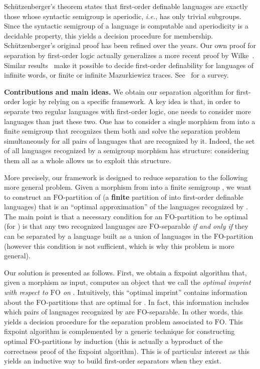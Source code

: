 \documentclass{CSML}
\newcommand{\fo}{\ensuremath{\text{FO}}\xspace}
\theoremstyle{plain}
\begin{document}
Schützenberger's theorem states that first-order definable languages
are exactly those whose syntactic semigroup is aperiodic, \emph{i.e.},
has only trivial subgroups. Since the syntactic semigroup of a
language is computable and aperiodicity is a decidable property, this
yields a decision procedure for membership. Schützenberger's original
proof has been refined over the years. Our own proof for separation by
first-order logic actually generalizes a more recent proof by
Wilke~\cite{wfo}. Similar results~\cite{tfo,pfo} make it possible to decide
first-order definability for languages of infinite words, or finite or
infinite Mazurkiewicz
traces. See~\cite{Diekert&Gastin:First-order-definable-languages:2008:a}
for a survey.

\smallskip\noindent
{\bf Contributions and main ideas.} We obtain our separation algorithm
for first-order logic by relying on a specific framework. A key idea
is that, in order to separate two regular languages with first-order
logic, one needs to consider more languages than just these two. One
has to consider a single morphism from  into a finite semigroup
 that recognizes them both and solve the separation problem simultaneously for all
pairs of languages that are recognized by it. Indeed,
the set of all languages recognized by a semigroup morphism has
structure: considering them all as a whole allows us to exploit
this structure.

More precisely, our framework is designed to reduce separation to the
following more general problem. Given a morphism  from 
into a finite semigroup , we want to construct an \fo-partition of
 (a {\bf finite} partition of  into first-order definable
languages) that is an  ``optimal approximation'' of the languages
recognized by . The main point is that a necessary condition
for an \fo-partition to be optimal (for ) is that any two
recognized languages are \fo-separable \emph{if and only if} they can
be separated by a language built as a union of languages in the
\fo-partition (however this condition is not sufficient, which is why
this problem is more general).

Our solution is presented as follows. First, we obtain a fixpoint
algorithm that, given a morphism  as input, computes an
object that we call the \emph{optimal imprint with respect to \fo on
  }. Intuitively, this ``optimal imprint'' contains
information about the \fo-partitions that are optimal for .
In fact, this information includes which pairs of languages recognized
by  are \fo-separable. In other words, this yields a decision
procedure for the separation problem associated to \fo. This fixpoint
algorithm is complemented by a generic technique for constructing
optimal \fo-partitions by induction (this is actually a byproduct of
the correctness proof of the fixpoint algorithm). This is of particular
interest as this yields an inductive way to build first-order
separators when they exist.
\end{document}
